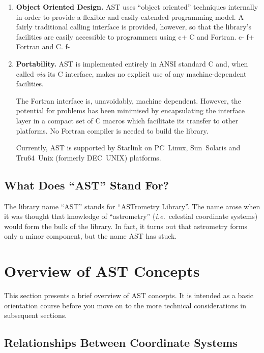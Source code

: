 \documentclass[twoside,11pt]{article}
\begin{document}
{\begin{enumerate}
\begin{quote}
\small
\begin{verbatim}
extern "C" {
#include "ast.h"
}
\end{verbatim}
\normalsize
\end{quote}

\item {\bf{Ob\mbox{}ject Oriented Design.}}
AST uses ``object oriented'' techniques internally in order to provide
a flexible and easily-extended programming model.  A fairly
traditional calling interface is provided, however, so that the
library's facilities are easily accessible to programmers using
c+
C and Fortran.
c-
f+
Fortran and C.
f-

\item {\bf{Portability.}}
AST is implemented entirely in ANSI standard C and, when called
{\em{via}} its C interface, makes no explicit use of any
machine-dependent facilities.

The Fortran interface is, unavoidably, machine dependent. However, the
potential for problems has been minimised by encapsulating the
interface layer in a compact set of C macros which facilitate its
transfer to other platforms. No Fortran compiler is needed to build
the library.

Currently, AST is supported by Starlink on PC~Linux, Sun~Solaris and
Tru64~Unix (formerly DEC~UNIX) platforms.
\end{enumerate}

\subsection{What Does ``AST'' Stand For?}

The library name ``AST'' stands for ``ASTrometry Library''. The name
arose when it was thought that knowledge of ``astrometry''
({\em{i.e.}}\ celestial coordinate systems) would form the bulk of the
library.  In fact, it turns out that astrometry forms only a minor
component, but the name AST has stuck.

\cleardoublepage
\section{Overview of AST Concepts}

This section presents a brief overview of AST concepts. It is intended
as a basic orientation course before you move on to the more technical
considerations in subsequent sections.

\subsection{\label{ss:mappingoverview}Relationships Between Coordinate Systems}

}
\end{document}
